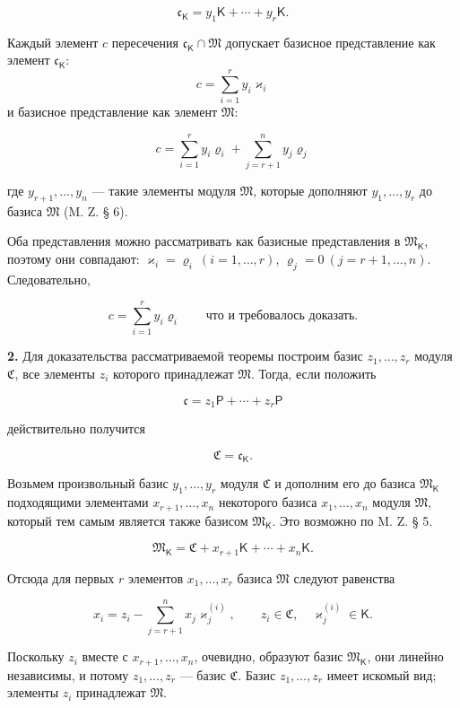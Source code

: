 \documentclass[11pt]{article}
\begin{document}
\[
\mathfrak c_{\mathsf K}=y_1\mathsf K+\cdots+y_r\mathsf K.
\]

Каждый элемент \(c\) пересечения \(\mathfrak c_{\mathsf K}\cap\mathfrak M\) допускает базисное представление как элемент \(\mathfrak c_{\mathsf K}\):
\[
c=\sum_{i=1}^{r}y_i\varkappa_i
\]
и базисное представление как элемент \(\mathfrak M\):

\[
c=\sum_{i=1}^{r}y_i\varrho_i+\sum_{j=r+1}^{n}y_j\varrho_j
\]

где \(y_{r+1},\ldots,y_n\) --- такие элементы модуля \(\mathfrak M\), которые дополняют \(y_1,\ldots,y_r\) до базиса \(\mathfrak M\) (M. Z. § 6).

Оба представления можно рассматривать как базисные представления в \(\mathfrak M_{\mathsf K}\), поэтому они совпадают: \(\varkappa_i=\varrho_i\ (i=1,\ldots,r)\), \(\varrho_j=0\ (j=r+1,\ldots,n)\). Следовательно,

\[
c=\sum_{i=1}^{r}y_i\varrho_i
\qquad\text{что и требовалось доказать.}
\]

\textbf{2.} Для доказательства рассматриваемой теоремы построим базис \(z_1,\ldots,z_r\) модуля \(\mathfrak C\), все элементы \(z_i\) которого принадлежат \(\mathfrak M\). Тогда, если положить

\[
\mathfrak c=z_1\mathsf P+\cdots+z_r\mathsf P
\]

действительно получится

\[
\mathfrak C=\mathfrak c_{\mathsf K}.
\]

Возьмем произвольный базис \(y_1,\ldots,y_r\) модуля \(\mathfrak C\) и дополним его до базиса \(\mathfrak M_{\mathsf K}\) подходящими элементами \(x_{r+1},\ldots,x_n\) некоторого базиса \(x_1,\ldots,x_n\) модуля \(\mathfrak M\), который тем самым является также базисом \(\mathfrak M_{\mathsf K}\). Это возможно по M. Z. § 5.

\[
\mathfrak M_{\mathsf K}=\mathfrak C+x_{r+1}\mathsf K+\cdots+x_n\mathsf K.
\]

Отсюда для первых \(r\) элементов \(x_1,\ldots,x_r\) базиса \(\mathfrak M\) следуют равенства

\[
x_i=z_i-\sum_{j=r+1}^{n}x_j\varkappa_j^{(i)},\qquad
z_i\in\mathfrak C,\quad \varkappa_j^{(i)}\in\mathsf K.
\]

Поскольку \(z_i\) вместе с \(x_{r+1},\ldots,x_n\), очевидно, образуют базис \(\mathfrak M_{\mathsf K}\), они линейно независимы, и потому \(z_1,\ldots,z_r\) --- базис \(\mathfrak C\). Базис \(z_1,\ldots,z_r\) имеет искомый вид; элементы \(z_i\) принадлежат \(\mathfrak M\).
\end{document}
